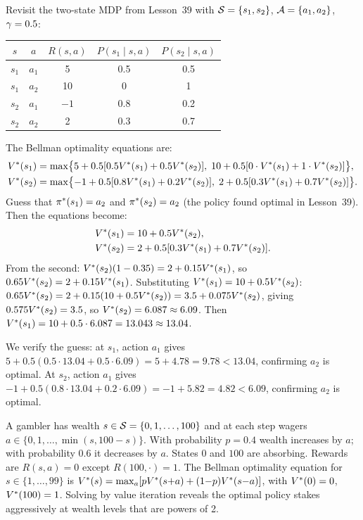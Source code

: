 \documentclass[11pt,a4paper]{article}
\begin{document}
\begin{example}
\label{ex:two-state-bellman}
Revisit the two-state MDP from Lesson~39 with $\mathcal{S} = \{s_1,s_2\}$,
$\mathcal{A} = \{a_1, a_2\}$, $\gamma = 0.5$:
\begin{center}
\begin{tabular}{ccccc}
\toprule
$s$ & $a$ & $R(s,a)$ & $P(s_1 \mid s,a)$ & $P(s_2 \mid s,a)$ \\
\midrule
$s_1$ & $a_1$ & 5 & 0.5 & 0.5 \\
$s_1$ & $a_2$ & 10 & 0 & 1 \\
$s_2$ & $a_1$ & $-1$ & 0.8 & 0.2 \\
$s_2$ & $a_2$ & 2 & 0.3 & 0.7 \\
\bottomrule
\end{tabular}
\end{center}
The Bellman optimality equations are:
\begin{align*}
    V^*(s_1) &= \max\!\big\{
    5 + 0.5[0.5 V^*(s_1) + 0.5 V^*(s_2)],\;
    10 + 0.5[0 \cdot V^*(s_1) + 1 \cdot V^*(s_2)]
    \big\}, \\
    V^*(s_2) &= \max\!\big\{
    {-1} + 0.5[0.8 V^*(s_1) + 0.2 V^*(s_2)],\;
    2 + 0.5[0.3 V^*(s_1) + 0.7 V^*(s_2)]
    \big\}.
\end{align*}
Guess that $\pi^*(s_1) = a_2$ and $\pi^*(s_2) = a_2$ (the
policy found optimal in Lesson~39). Then the equations become:
\begin{align*}
    V^*(s_1) &= 10 + 0.5 V^*(s_2), \\
    V^*(s_2) &= 2 + 0.5[0.3 V^*(s_1) + 0.7 V^*(s_2)].
\end{align*}
From the second: $V^*(s_2)(1 - 0.35) = 2 + 0.15 V^*(s_1)$,
so $0.65 V^*(s_2) = 2 + 0.15 V^*(s_1)$. Substituting
$V^*(s_1) = 10 + 0.5 V^*(s_2)$:
$0.65 V^*(s_2) = 2 + 0.15(10 + 0.5 V^*(s_2))
= 3.5 + 0.075 V^*(s_2)$, giving
$0.575 V^*(s_2) = 3.5$, so $V^*(s_2) = 6.087 \approx 6.09$.
Then $V^*(s_1) = 10 + 0.5 \cdot 6.087 = 13.043 \approx 13.04$.

We verify the guess: at $s_1$, action $a_1$ gives
$5 + 0.5(0.5 \cdot 13.04 + 0.5 \cdot 6.09) = 5 + 4.78 = 9.78 < 13.04$,
confirming $a_2$ is optimal. At $s_2$, action $a_1$ gives
$-1 + 0.5(0.8 \cdot 13.04 + 0.2 \cdot 6.09) = -1 + 5.82 = 4.82 < 6.09$,
confirming $a_2$ is optimal.
\end{example}

\begin{example}
\label{ex:gambling}
A gambler has wealth $s \in \mathcal{S} = \{0, 1, \ldots, 100\}$ and at
each step wagers $a \in \{0, 1, \ldots, \min(s, 100-s)\}$. With
probability $p = 0.4$ wealth increases by $a$; with probability $0.6$
it decreases by $a$. States $0$ and $100$ are absorbing. Rewards are
$R(s,a) = 0$ except $R(100,\cdot) = 1$. The Bellman optimality
equation for $s \in \{1, \ldots, 99\}$ is
$V^*(s) = \max_{a} [p V^*(s{+}a) + (1{-}p) V^*(s{-}a)]$,
with $V^*(0) = 0$, $V^*(100) = 1$. Solving by value iteration
reveals the optimal policy stakes aggressively at wealth levels that
are powers of 2.
\end{example}
\end{document}
